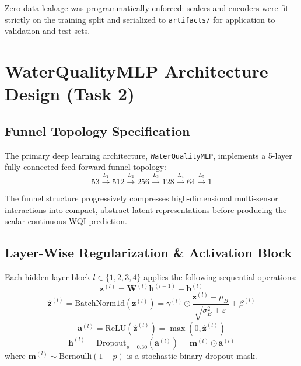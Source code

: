 \documentclass[conference]{IEEEtran}
\begin{document}
Zero data leakage was programmatically enforced: scalers and encoders were fit strictly on the
training split and serialized to \texttt{artifacts/} for application to validation and test sets.

\section{WaterQualityMLP Architecture Design (Task 2)}
\label{sec:mlp_arch}

\subsection{Funnel Topology Specification}
The primary deep learning architecture, \texttt{WaterQualityMLP}, implements a 5-layer
fully connected feed-forward funnel topology:
\begin{equation}
  53 \xrightarrow{L_1} 512 \xrightarrow{L_2} 256 \xrightarrow{L_3} 128 \xrightarrow{L_4} 64 \xrightarrow{L_5} 1
\end{equation}

The funnel structure progressively compresses high-dimensional multi-sensor interactions
into compact, abstract latent representations before producing the scalar continuous WQI prediction.

\subsection{Layer-Wise Regularization \& Activation Block}
Each hidden layer block $l \in \{1, 2, 3, 4\}$ applies the following sequential operations:
\begin{equation}
  \mathbf{z}^{(l)} = \mathbf{W}^{(l)}\mathbf{h}^{(l-1)} + \mathbf{b}^{(l)}
\end{equation}
\begin{equation}
  \hat{\mathbf{z}}^{(l)} = \text{BatchNorm1d}\!\left(\mathbf{z}^{(l)}\right) = \gamma^{(l)} \odot \frac{\mathbf{z}^{(l)} - \mu_B}{\sqrt{\sigma_B^2 + \varepsilon}} + \beta^{(l)}
\end{equation}
\begin{equation}
  \mathbf{a}^{(l)} = \text{ReLU}\!\left(\hat{\mathbf{z}}^{(l)}\right) = \max\!\left(0, \hat{\mathbf{z}}^{(l)}\right)
\end{equation}
\begin{equation}
  \mathbf{h}^{(l)} = \text{Dropout}_{p=0.30}\!\left(\mathbf{a}^{(l)}\right) = \mathbf{m}^{(l)} \odot \mathbf{a}^{(l)}
\end{equation}
where $\mathbf{m}^{(l)} \sim \text{Bernoulli}(1 - p)$ is a stochastic binary dropout mask.
\end{document}
